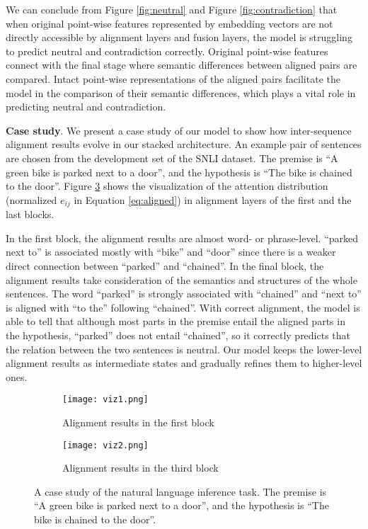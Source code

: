 \documentclass[11pt,a4paper]{article}
\begin{document}
We can conclude from Figure \ref{fig:neutral} and Figure \ref{fig:contradiction} that when original point-wise features represented by embedding vectors are not directly accessible by alignment layers and fusion layers, the model is struggling to predict neutral and contradiction correctly. Original point-wise features connect with the final stage where semantic differences between aligned pairs are compared. Intact point-wise representations of the aligned pairs facilitate the model in the comparison of their semantic differences, which plays a vital role in predicting neutral and contradiction.

{\bf Case study}. We present a case study of our model to show how inter-sequence alignment results evolve in our stacked architecture. An example pair of sentences are chosen from the development set of the SNLI dataset. The premise is ``A green bike is parked next to a door'', and the hypothesis is ``The bike is chained to the door''. Figure \ref{fig:example} shows the visualization of the attention distribution (normalized $e_{ij}$ in Equation \ref{eq:aligned}) in alignment layers of the first and the last blocks. 

In the first block, the alignment results are almost word- or phrase-level. ``parked next to'' is associated mostly with ``bike'' and ``door'' since there is a weaker direct connection between ``parked'' and ``chained''. In the final block, the alignment results take consideration of the semantics and structures of the whole sentences. The word ``parked'' is strongly associated with ``chained'' and ``next to'' is aligned with ``to the'' following ``chained''. With correct alignment, the model is able to tell that although most parts in the premise entail the aligned parts in the hypothesis, ``parked'' does not entail ``chained'', so it correctly predicts that the relation between the two sentences is neutral. Our model keeps the lower-level alignment results as intermediate states and gradually refines them to higher-level ones.

\begin{figure}
  \centering
  \begin{subfigure}{\linewidth}
    \centering
    \texttt{[image: viz1.png]}
    \caption{Alignment results in the first block}
    \label{fig:ex1}
  \end{subfigure}
  \begin{subfigure}{\linewidth}
    \centering
    \texttt{[image: viz2.png]}
    \caption{Alignment results in the third block}
    \label{fig:ex2}
\end{subfigure}
  \caption{A case study of the natural language inference task. The premise is ``A green bike is parked next to a door'', and the hypothesis is ``The bike is chained to the door''. }
  \label{fig:example}
\end{figure}
\end{document}

